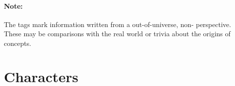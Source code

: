 

\paragraph{Note:} 
The  tags mark information written from a out-of-universe, non-\Miithian{} perspective. 
These may be comparisons with the real world or trivia about the origins of concepts. 















\section{Characters}
